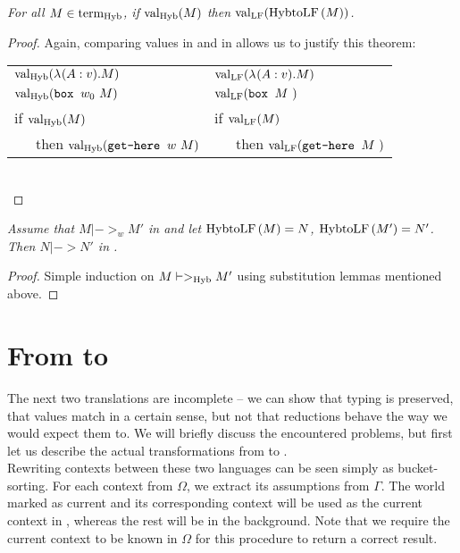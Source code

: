 \begin{theorem} \em
For all $M \in \teHyb{}$, if $\val[\tHyb]{M}$ then $\val[\tLF]{\funHybtoLF{M}}$.
\begin{proof}
Again, comparing values in \langHyb{} and in \langLF{} allows us to justify this theorem:\\

\begin{tabular}{ l l }
$\val[\tHyb]{\lam A v M}$ &
$\val[\tLF]{\lam A v M}$\\
$\val[\tHyb]{\bbox {w_0} M}$ &
$\val[\tLF]{\bbox M}$\\
if ${\val [\tHyb] M}$ &
if ${\val [\tLF] M}$ \\
~~~then ${\val [\tHyb] {\gethere w M}}$ &
~~~then ${\val [\tLF] {\gethere M}}$
\end{tabular}\\
\end{proof}
\end{theorem}

\begin{theorem}\em
Assume that $M |->_w M'$ in \langHyb{} and let $\funHybtoLF{M} = N$, $\funHybtoLF{M'} = N'$. Then $N |-> N'$ in \langLF{}.
\begin{proof}
Simple induction on $M |->_{\tHyb} M'$ using substitution lemmas mentioned above.
\end{proof}
\end{theorem}



\section{From \langL{} to \langHyb{}}

The next two translations are incomplete -- we can show that typing is preserved, that values match in a certain sense, but not that reductions behave the way we would expect them to. We will briefly discuss the encountered problems, but first let us describe the actual transformations from \langL{} to \langHyb{}.\\

Rewriting contexts between these two languages can be seen simply as bucket-sorting. For each context from $\Omega$, we extract its assumptions from $\Gamma$. The world marked as current and its corresponding context will be used as the current context in \langHyb{}, whereas the rest will be in the background. Note that we require the current context to be known in $\Omega$ for this procedure to return a correct result.\\

